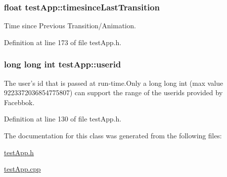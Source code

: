 \hypertarget{classtest_app_acb60fb8a89e9ec5d461630a20b11ceda}{
\subsubsection[{timesince\-Last\-Transition}]{\setlength{\rightskip}{0pt plus 5cm}float test\-App\-::timesince\-Last\-Transition}}\label{classtest_app_acb60fb8a89e9ec5d461630a20b11ceda}


Time since Previous Transition/\-Animation. 



Definition at line 173 of file test\-App.\-h.

\hypertarget{classtest_app_a6ae76dc97fbeee00755f4a6cd6b87e19}{
\subsubsection[{userid}]{\setlength{\rightskip}{0pt plus 5cm}long long int test\-App\-::userid}}\label{classtest_app_a6ae76dc97fbeee00755f4a6cd6b87e19}


The user's id that is passed at run-\/time.\-Only a long long int (max value 9223372036854775807) can support the range of the userids provided by Facebbok. 



Definition at line 130 of file test\-App.\-h.



The documentation for this class was generated from the following files\-:\begin{DoxyCompactItemize}
\item 
\hyperlink{test_app_8h}{test\-App.\-h}\item 
\hyperlink{test_app_8cpp}{test\-App.\-cpp}\end{DoxyCompactItemize}
